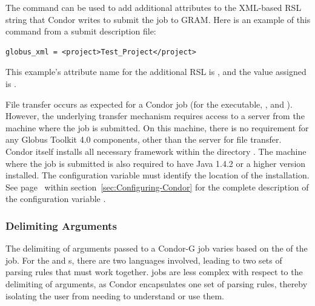 
The  command can be used to add additional
attributes to the XML-based RSL string that Condor writes to submit the
job to GRAM.
Here is an example of this command from a submit description file:
\begin{verbatim}
globus_xml = <project>Test_Project</project>
\end{verbatim}
This example's attribute name for the additional RSL is
, and the value assigned is .

File transfer occurs as expected for a Condor job 
(for the executable, , and ).
However, the underlying transfer mechanism requires access
to a  server from the machine where the job
is submitted.
On this machine,
there is no requirement for any Globus Toolkit 4.0 components, other than
the  server for file transfer.
Condor itself installs all necessary framework within the directory 
.
The machine where the job is submitted
is also required to
have Java 1.4.2 or a higher version installed.
The configuration variable 
must identify the location of the installation.
See page~\pageref{param:Java} within
section~\ref{sec:Configuring-Condor}
for the complete description of the configuration variable .


\subsubsection{\label{sec:CondorG-Submit-Args}Delimiting Arguments}

The delimiting of arguments passed to a Condor-G 
job varies based on the  of the job.
For the  and  s,
there are two languages involved, 
leading to two sets of parsing rules that must work together.
  jobs
are less complex with respect to the delimiting of arguments,
as Condor encapsulates one set of parsing rules,
thereby isolating the user from needing to understand or use them.

